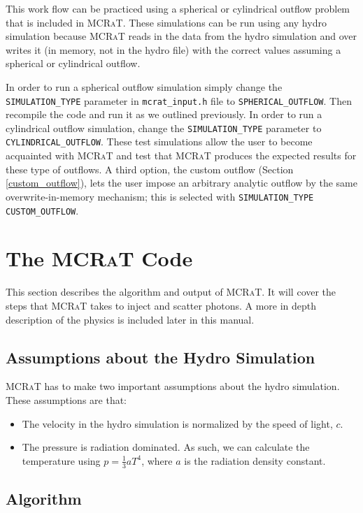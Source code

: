 \documentclass[12pt,a4paper]{article}
\newcommand{\mcrat}{\textsc{MCRaT}}
\begin{document}
 This work flow can be practiced using a spherical or cylindrical outflow problem that is included in \mcrat{}. These simulations can be run using any hydro simulation because \mcrat{} reads in the data from the hydro simulation and over writes it (in memory, not in the hydro file) with the correct values assuming a spherical or cylindrical outflow.
 
 In order to run a spherical outflow simulation simply change the \texttt{SIMULATION\_TYPE} parameter in \texttt{mcrat\_input.h} file to \texttt{SPHERICAL\_OUTFLOW}. Then recompile the code and run it as we outlined previously. In order to run a cylindrical outflow simulation, change the \texttt{SIMULATION\_TYPE} parameter to \texttt{CYLINDRICAL\_OUTFLOW}. These test simulations allow the user to become acquainted with \mcrat{} and test that \mcrat{} produces the expected results for these type of outflows. A third option, the custom outflow (Section \ref{custom_outflow}), lets the user impose an arbitrary analytic outflow by the same overwrite-in-memory mechanism; this is selected with \texttt{SIMULATION\_TYPE CUSTOM\_OUTFLOW}.
 

\section{The \mcrat{} Code}
This section describes the algorithm and output of \mcrat{}. It will cover the steps that \mcrat{} takes to inject and scatter photons. A more in depth description of the physics is included later in this manual.

\subsection{Assumptions about the Hydro Simulation}
\mcrat{} has to make two important assumptions about the hydro simulation. These assumptions are that:
\begin{itemize}
\item[1.] The velocity in the hydro simulation is normalized by the speed of light, $c$. 
\item[2.] The pressure is radiation dominated. As such, we can calculate the temperature using $p=\frac{1}{3}aT^4$, where $a$ is the radiation density constant.
\end{itemize}

\subsection{Algorithm}\label{algorithm}
\end{document}

